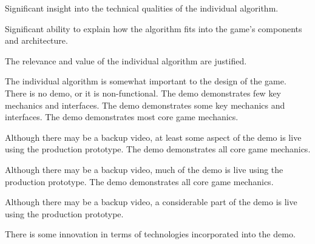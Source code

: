 \documentclass{../../fal_assignment}
\begin{document}
\begin{markingrubric}
        \grade Significant insight into the technical qualities of the individual algorithm.
            \par Significant ability to explain how the algorithm fits into the game's components and architecture.
            \par The relevance and value of the  individual algorithm are justified.
            \par The  individual algorithm is somewhat important to the design of the game.
%
        \grade\fail There is no demo, or it is non-functional.
        \grade The demo demonstrates few key mechanics and interfaces.
        \grade The demo demonstrates some key mechanics and interfaces.
        \grade The demo demonstrates most core game mechanics.
            \par Although there may be a backup video, at least some aspect of the demo is live using the production prototype.
        \grade The demo demonstrates all core game mechanics.
            \par Although there may be a backup video, much of the demo is live using the production prototype.
        \grade The demo demonstrates all core game mechanics.
            \par Although there may be a backup video, a considerable part of the demo is live using the production prototype.
            \par There is some innovation in terms of technologies incorporated into the demo.
\end{markingrubric}
\end{document}
